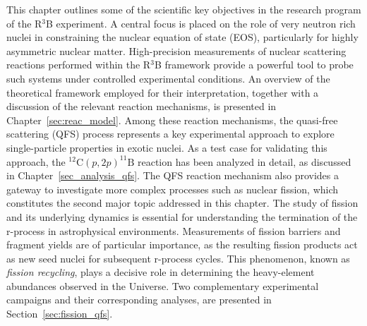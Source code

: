 This chapter outlines some of the scientific key objectives in the research program of the R$^3$B experiment. A central focus is placed on the role of very neutron rich nuclei in constraining the nuclear equation of state (EOS), particularly for highly asymmetric nuclear matter. High-precision measurements of nuclear scattering reactions performed within the R$^3$B framework provide a powerful tool to probe such systems under controlled experimental conditions. An overview of the theoretical framework employed for their interpretation, together with a discussion of the relevant reaction mechanisms, is presented in Chapter~\ref{sec:reac_model}.\newline
Among these reaction mechanisms, the quasi-free scattering (QFS) process represents a key experimental approach to explore single-particle properties in exotic nuclei. As a test case for validating this approach, the $^{12}\mathrm{C}(p,2p)^{11}\mathrm{B}$ reaction has been analyzed in detail, as discussed in Chapter~\ref{sec_analysis_qfs}.\newline
The QFS reaction mechanism also provides a gateway to investigate more complex processes such as nuclear fission, which constitutes the second major topic addressed in this chapter. The study of fission and its underlying dynamics is essential for understanding the termination of the r-process in astrophysical environments. Measurements of fission barriers and fragment yields are of particular importance, as the resulting fission products act as new seed nuclei for subsequent r-process cycles. This phenomenon, known as \textit{fission recycling}, plays a decisive role in determining the heavy-element abundances observed in the Universe. Two complementary experimental campaigns and their corresponding analyses, are presented in Section~\ref{sec:fission_qfs}.

